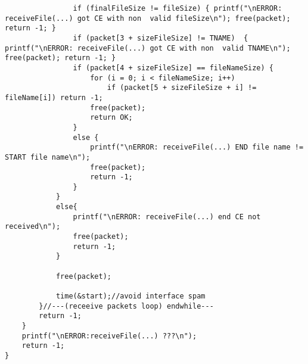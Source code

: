 \begin{lstlisting}
				if (finalFileSize != fileSize) { printf("\nERROR: receiveFile(...) got CE with non  valid fileSize\n"); free(packet); return -1; }
				if (packet[3 + sizeFileSize] != TNAME)  { printf("\nERROR: receiveFile(...) got CE with non  valid TNAME\n"); free(packet); return -1; }
				if (packet[4 + sizeFileSize] == fileNameSize) {
					for (i = 0; i < fileNameSize; i++)
						if (packet[5 + sizeFileSize + i] != fileName[i]) return -1;
					free(packet);
					return OK;
				}
				else {
					printf("\nERROR: receiveFile(...) END file name != START file name\n");
					free(packet);
					return -1;
				}
			}
			else{
				printf("\nERROR: receiveFile(...) end CE not received\n");
				free(packet);
				return -1;
			}

			free(packet);

			time(&start);//avoid interface spam
		}//---(receeive packets loop) endwhile---
		return -1;
	}
	printf("\nERROR:receiveFile(...) ???\n");
	return -1;
}

\end{lstlisting}
